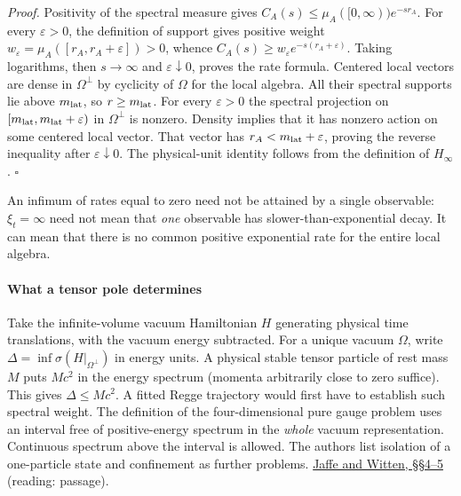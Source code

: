 \documentclass[11pt,a4paper]{article}
\begin{document}
\emph{Proof.} Positivity of the spectral measure gives
\(C_A(s)\le\mu_A([0,\infty))e^{-sr_A}\). For every \(\varepsilon>0\),
the definition of support gives positive weight
\(w_\varepsilon=\mu_A([r_A,r_A+\varepsilon])>0\), whence
\(C_A(s)\ge w_\varepsilon e^{-s(r_A+\varepsilon)}\). Taking logarithms,
then \(s\to\infty\) and \(\varepsilon\downarrow0\), proves the rate
formula. Centered local vectors are dense in \(\Omega^\perp\) by
cyclicity of \(\Omega\) for the local algebra. All their spectral
supports lie above \(m_{\rm lat}\), so \(r\ge m_{\rm lat}\). For every
\(\varepsilon>0\) the spectral projection on
\([m_{\rm lat},m_{\rm lat}+\varepsilon)\) in \(\Omega^\perp\) is
nonzero. Density implies that it has nonzero action on some centered
local vector. That vector has \(r_A<m_{\rm lat}+\varepsilon\), proving
the reverse inequality after \(\varepsilon\downarrow0\). The
physical-unit identity follows from the definition of \(H_\infty\).
\(\square\)

An infimum of rates equal to zero need not be attained by a single
observable: \(\xi_t=\infty\) need not mean that \emph{one} observable
has slower-than-exponential decay. It can mean that there is no common
positive exponential rate for the entire local algebra.

\paragraph{What a tensor pole
determines}\label{what-a-tensor-pole-determines}

Take the infinite-volume vacuum Hamiltonian \(H\) generating physical
time translations, with the vacuum energy subtracted. For a unique
vacuum \(\Omega\), write \(\Delta=\inf\sigma(H|_{\Omega^\perp})\) in
energy units. A physical stable tensor particle of rest mass \(M\) puts
\(Mc^2\) in the energy spectrum (momenta arbitrarily close to zero
suffice). This gives \(\Delta\le Mc^2\). A fitted Regge trajectory would
first have to establish such spectral weight. The definition of the
four-dimensional pure gauge problem uses an interval free of
positive-energy spectrum in the \emph{whole} vacuum representation.
Continuous spectrum above the interval is allowed. The authors list
isolation of a one-particle state and confinement as further problems.
\href{https://www.claymath.org/wp-content/uploads/2022/06/yangmills.pdf}{Jaffe
and Witten, §§4--5} (reading: passage).
\end{document}
